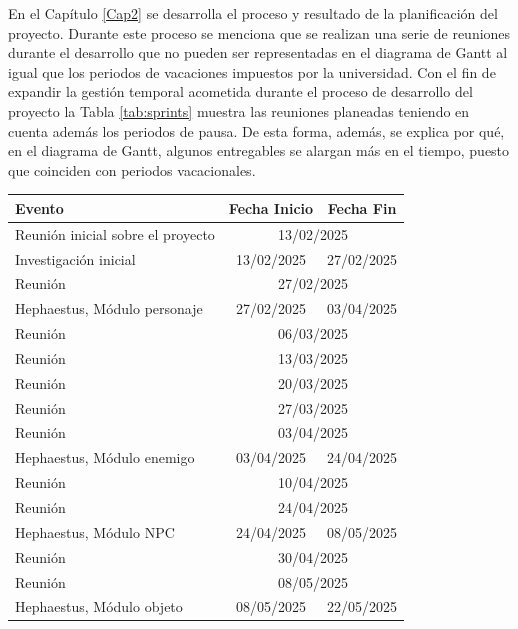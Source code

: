 En el Capítulo \ref{Cap2} se desarrolla el proceso y resultado de la planificación del proyecto. Durante este proceso se menciona que se realizan una serie de reuniones durante el desarrollo que no pueden ser representadas en el diagrama de Gantt al igual que los periodos de vacaciones impuestos por la universidad. Con el fin de expandir la gestión temporal acometida durante el proceso de desarrollo del proyecto la Tabla \ref{tab:sprints} muestra las reuniones planeadas teniendo en cuenta además los periodos de pausa. De esta forma, además, se explica por qué, en el diagrama de Gantt, algunos entregables se alargan más en el tiempo, puesto que coinciden con periodos vacacionales.

{\small
\begin{longtable}[c]{|l|cc|}
	\hline
	\rowcolor[HTML]{C0C0C0}
	\textbf{Evento} & \multicolumn{1}{c|}{\textbf{Fecha Inicio}} & \textbf{Fecha Fin} \\ \hline
	\endfirsthead
	\endhead
	Reunión inicial sobre el proyecto & \multicolumn{2}{c|}{13/02/2025} \\ \hline
	Investigación inicial & \multicolumn{1}{c|}{13/02/2025} & 27/02/2025 \\ \hline
	Reunión & \multicolumn{2}{c|}{27/02/2025} \\ \hline
	Hephaestus, Módulo personaje & \multicolumn{1}{c|}{27/02/2025} & 03/04/2025 \\ \hline
	Reunión & \multicolumn{2}{c|}{06/03/2025} \\ \hline
	Reunión & \multicolumn{2}{c|}{13/03/2025} \\ \hline
	Reunión & \multicolumn{2}{c|}{20/03/2025} \\ \hline
	Reunión & \multicolumn{2}{c|}{27/03/2025} \\ \hline
	Reunión & \multicolumn{2}{c|}{03/04/2025} \\ \hline
	Hephaestus, Módulo enemigo & \multicolumn{1}{c|}{03/04/2025} & 24/04/2025 \\ \hline
	Reunión & \multicolumn{2}{c|}{10/04/2025} \\ \hline
	Reunión & \multicolumn{2}{c|}{24/04/2025} \\ \hline
	Hephaestus, Módulo NPC & \multicolumn{1}{c|}{24/04/2025} & 08/05/2025 \\ \hline
	Reunión & \multicolumn{2}{c|}{30/04/2025} \\ \hline
	Reunión & \multicolumn{2}{c|}{08/05/2025} \\ \hline
	Hephaestus, Módulo objeto & \multicolumn{1}{c|}{08/05/2025} & 22/05/2025 \\ \hline

\end{longtable}}
